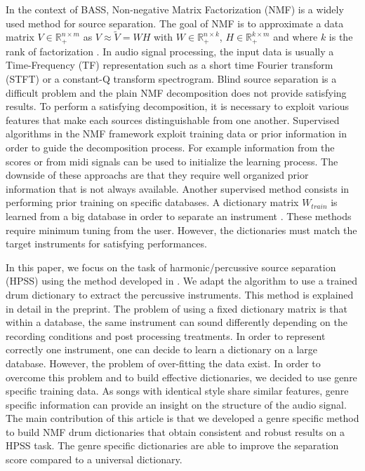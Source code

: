 \documentclass{article}
\begin{document}
In the context of BASS, Non-negative Matrix Factorization (NMF) is a widely used method for source separation. The goal of NMF is to approximate a data matrix $V \in \mathbb{R}_{+}^{n \times m} $ as $V \approx \tilde{V} = WH$ with $W \in \mathbb{R}_{+}^{n \times k}$, $H \in \mathbb{R}_{+}^{k \times m}$ and where $k$ is the rank of factorization \cite{lee99}. In audio signal processing, the input data is usually a Time-Frequency (TF) representation such as a short time Fourier transform (STFT) or a constant-Q transform spectrogram. Blind source separation is a difficult problem and the plain NMF decomposition does not provide satisfying results. To perform a satisfying decomposition, it is necessary to exploit various features that make each sources distinguishable from one another. 
Supervised algorithms in the NMF framework exploit training data or prior information in order to guide the decomposition process. For example information from the scores or from midi signals \cite{EwertM12} can be used to initialize the learning process. The downside of these approachs are that they require well organized prior information that is not always available. Another supervised method consists in performing prior training on specific databases. A dictionary matrix $W_{train}$ is learned from a big database in order to separate an instrument \cite{jaureguiberry2011adaptation,wudrum}. These methods require minimum tuning from the user. However, the dictionaries must match the target instruments for satisfying performances. 


In this paper, we focus on the task of harmonic/percussive source separation (HPSS) using the method developed in \cite{laroche2015structured}. We adapt the algorithm to use a trained drum dictionary to extract the percussive instruments. This method is explained in detail in the preprint. 
The problem of using a fixed dictionary matrix is that within a database, the same instrument can sound differently depending on the recording conditions and post processing treatments. In order to represent correctly one instrument, one can decide to learn a dictionary on a large database. However, the problem of over-fitting the data exist. In order to overcome this problem and to build effective dictionaries, we decided to use genre specific training data. As songs with identical style share similar features, genre specific information can provide an insight on the structure of the audio signal.
The main contribution of this article is that we developed a genre specific method to build NMF drum dictionaries that obtain consistent and robust results on a HPSS task. The genre specific dictionaries are able to improve the separation score compared to a universal dictionary. 
 
\end{document}

